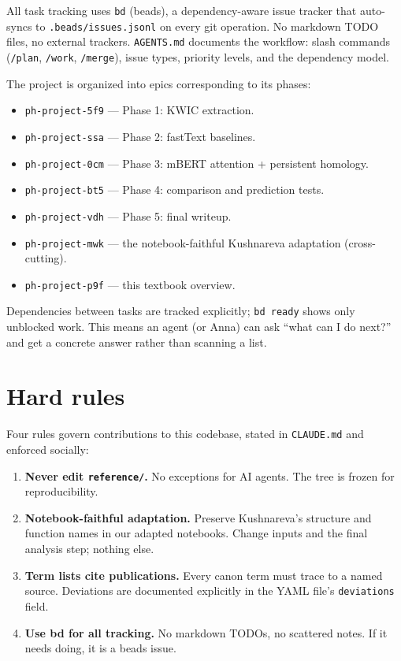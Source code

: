 All task tracking uses \texttt{bd} (beads), a dependency-aware issue tracker that auto-syncs to \texttt{.beads/issues.jsonl} on every git operation. No markdown TODO files, no external trackers. \texttt{AGENTS.md} documents the workflow: slash commands (\texttt{/plan}, \texttt{/work}, \texttt{/merge}), issue types, priority levels, and the dependency model.

The project is organized into epics corresponding to its phases:

\begin{itemize}
  \item \texttt{ph-project-5f9} --- Phase 1: KWIC extraction.
  \item \texttt{ph-project-ssa} --- Phase 2: fastText baselines.
  \item \texttt{ph-project-0cm} --- Phase 3: mBERT attention + persistent homology.
  \item \texttt{ph-project-bt5} --- Phase 4: comparison and prediction tests.
  \item \texttt{ph-project-vdh} --- Phase 5: final writeup.
  \item \texttt{ph-project-mwk} --- the notebook-faithful Kushnareva adaptation (cross-cutting).
  \item \texttt{ph-project-p9f} --- this textbook overview.
\end{itemize}

Dependencies between tasks are tracked explicitly; \texttt{bd ready} shows only unblocked work. This means an agent (or Anna) can ask ``what can I do next?'' and get a concrete answer rather than scanning a list.

\section{Hard rules}
\label{sec:hard-rules}

Four rules govern contributions to this codebase, stated in \texttt{CLAUDE.md} and enforced socially:

\begin{enumerate}
  \item \textbf{Never edit \texttt{reference/}.} No exceptions for AI agents. The tree is frozen for reproducibility.
  \item \textbf{Notebook-faithful adaptation.} Preserve Kushnareva's structure and function names in our adapted notebooks. Change inputs and the final analysis step; nothing else.
  \item \textbf{Term lists cite publications.} Every canon term must trace to a named source. Deviations are documented explicitly in the YAML file's \texttt{deviations} field.
  \item \textbf{Use bd for all tracking.} No markdown TODOs, no scattered notes. If it needs doing, it is a beads issue.
\end{enumerate}

